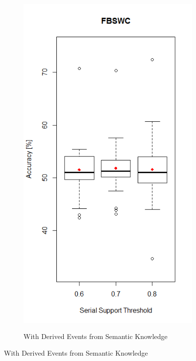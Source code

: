 \begin{figure}[h]
\centering
\begin{subfigure}{.5\textwidth}
  \centering
  \includegraphics[width=\linewidth]{fbswcSupportSerialWithSemantic}
  \label{fig_fbswcSupportSerialWithSemantic}
  \caption{With Derived Events from Semantic Knowledge}
\end{subfigure}%

\end{figure}

